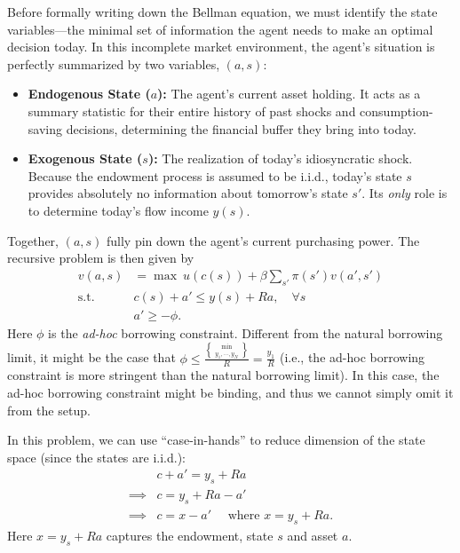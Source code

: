Before formally writing down the Bellman equation, we must identify the state variables—the minimal set of information the agent needs to make an optimal decision today. In this incomplete market environment, the agent's situation is perfectly summarized by two variables, $(a, s)$:
\begin{itemize}
    \item \textbf{Endogenous State ($a$):} The agent's current asset holding. It acts as a summary statistic for their entire history of past shocks and consumption-saving decisions, determining the financial buffer they bring into today.
    \item \textbf{Exogenous State ($s$):} The realization of today's idiosyncratic shock. Because the endowment process is assumed to be i.i.d., today's state $s$ provides absolutely no information about tomorrow's state $s'$. Its \textit{only} role is to determine today's flow income $y(s)$. 
\end{itemize}
Together, $(a,s)$ fully pin down the agent's current purchasing power. The recursive problem is then given by
\[
\begin{aligned}
    v(a,s) & = \max \ u(c(s))+\beta \sum_{s'}\pi(s')v(a',s')\\
\text{s.t. }  & c(s) + a' \le y(s) + Ra, \quad \forall s\\
& a' \ge -\phi.
\end{aligned}
\]
Here $\phi$ is the \textit{ad-hoc} borrowing constraint. Different from the natural borrowing limit, it might be the case that $\phi\le \frac{\min\brace{y_1,\cdots,y_N}}{R} =  \frac{y_1}{R}$ (i.e., the ad-hoc borrowing constraint is more stringent than the natural borrowing limit). In this case, the ad-hoc borrowing constraint might be binding, and thus we cannot simply omit it from the setup.

In this problem, we can use ``case-in-hands'' to reduce dimension of the state space (since the states are i.i.d.):
\[  
\begin{aligned}
    & c+a' = y_s+Ra\\
    \implies & c = y_s+Ra-a'\\
    \implies & c = x-a'\quad \text{ where } x = y_s + Ra.
\end{aligned}
\]
Here $x = y_s+Ra$ captures the endowment, state $s$ and asset $a$.

